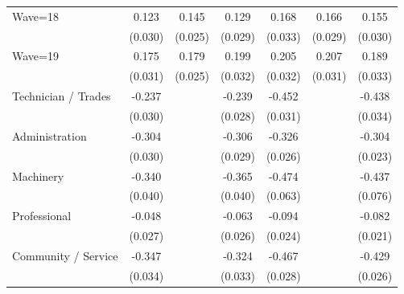 {\begin{tabular}{l*{6}{c}}
Wave=18             &       0.123\sym{***}&       0.145\sym{***}&       0.129\sym{***}&       0.168\sym{***}&       0.166\sym{***}&       0.155\sym{***}\\
                    &     (0.030)         &     (0.025)         &     (0.029)         &     (0.033)         &     (0.029)         &     (0.030)         \\
Wave=19             &       0.175\sym{***}&       0.179\sym{***}&       0.199\sym{***}&       0.205\sym{***}&       0.207\sym{***}&       0.189\sym{***}\\
                    &     (0.031)         &     (0.025)         &     (0.032)         &     (0.032)         &     (0.031)         &     (0.033)         \\
Technician / Trades &      -0.237\sym{***}&                     &      -0.239\sym{***}&      -0.452\sym{***}&                     &      -0.438\sym{***}\\
                    &     (0.030)         &                     &     (0.028)         &     (0.031)         &                     &     (0.034)         \\
Administration      &      -0.304\sym{***}&                     &      -0.306\sym{***}&      -0.326\sym{***}&                     &      -0.304\sym{***}\\
                    &     (0.030)         &                     &     (0.029)         &     (0.026)         &                     &     (0.023)         \\
Machinery           &      -0.340\sym{***}&                     &      -0.365\sym{***}&      -0.474\sym{***}&                     &      -0.437\sym{***}\\
                    &     (0.040)         &                     &     (0.040)         &     (0.063)         &                     &     (0.076)         \\
Professional        &      -0.048\sym{*}  &                     &      -0.063\sym{**} &      -0.094\sym{***}&                     &      -0.082\sym{***}\\
                    &     (0.027)         &                     &     (0.026)         &     (0.024)         &                     &     (0.021)         \\
Community / Service &      -0.347\sym{***}&                     &      -0.324\sym{***}&      -0.467\sym{***}&                     &      -0.429\sym{***}\\
                    &     (0.034)         &                     &     (0.033)         &     (0.028)         &                     &     (0.026)         \\

\end{tabular}}

